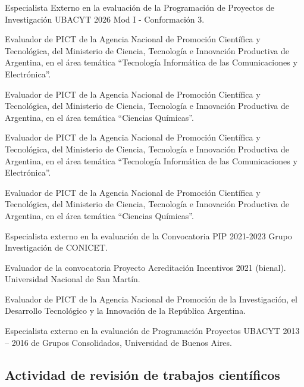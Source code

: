 \begin{timeline}
 Especialista Externo en la evaluación de la Programación de Proyectos de Investigación UBACYT 2026 Mod I - Conformación 3.

 Evaluador de PICT de la Agencia Nacional de Promoción Científica y Tecnológica, del Ministerio de Ciencia, Tecnología e Innovación Productiva de Argentina, en el área temática ``Tecnología Informática de las Comunicaciones y Electrónica''.

 Evaluador de PICT de la Agencia Nacional de Promoción Científica y Tecnológica, del Ministerio de Ciencia, Tecnología e
Innovación Productiva de Argentina, en el área temática ``Ciencias Químicas''.

 Evaluador de PICT de la Agencia Nacional de Promoción Científica y Tecnológica, del Ministerio de Ciencia, Tecnología e
Innovación Productiva de Argentina, en el área temática ``Tecnología Informática de las Comunicaciones y Electrónica''.

 Evaluador de PICT de la Agencia Nacional de Promoción Científica y Tecnológica, del Ministerio de Ciencia, Tecnología e
Innovación Productiva de Argentina, en el área temática ``Ciencias Químicas''.

 Especialista externo en la evaluación de la Convocatoria PIP 2021-2023 Grupo Investigación de CONICET.

 Evaluador de la convocatoria Proyecto Acreditación Incentivos 2021 (bienal). Universidad Nacional de San Martín.

 Evaluador de PICT de la Agencia Nacional de Promoción de la Investigación, el Desarrollo Tecnológico y la Innovación de la República Argentina.

 Especialista externo en la evaluación de Programación Proyectos UBACYT 2013 -- 2016 de Grupos Consolidados, Universidad de Buenos Aires.
\end{timeline}

\subsection{Actividad de revisión de trabajos científicos}

